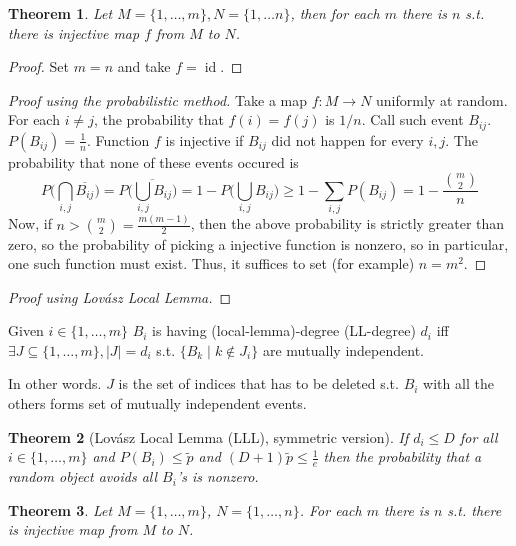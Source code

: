 \documentclass{article}
\theoremstyle{plain}
\newtheorem{thm}{Theorem}
\theoremstyle{definition}
\begin{document}
\begin{thm}
	Let $M=\{1,\ldots,m\},N=\{1,\ldots n\}$, then for each $m$ there is $n$ s.t. there is injective map $f$ from $M$ to $N$.
\end{thm}
\begin{proof}
	Set $m=n$ and take $f=\operatorname{id}$.
\end{proof}
\begin{proof}[Proof using the probabilistic method]
	Take a map $f:M\rightarrow {N}$ uniformly at random. For each $i\neq j$, the probability that $f(i)=f(j)$ is $1/n$. Call such event $B_{ij}$. $P(B_{ij})=\frac{1}{n}$. Function $f$ is injective if $B_{ij}$ did not happen for every $i,j$. The probability that none of these events occured is $$P\bigg(\bigcap_{i,j}\overline{B_{ij}}\bigg)=P\bigg(\overline{\bigcup_{i,j}B_{ij}}\bigg)=1-P\bigg(\bigcup_{i,j}B_{ij}\bigg)\geq 1-\sum_{i,j}P(B_{ij})=1-\frac{{m\choose 2}}{n}$$ Now, if $n > {m\choose 2}=\frac{m(m-1)}{2}$, then the above probability is strictly greater than zero, so the probability of picking a injective function is nonzero, so in particular, one such function must exist. Thus, it suffices to set (for example) $n = m^2$.
\end{proof}

\begin{proof}[Proof using Lovász Local Lemma]
	
\end{proof}








 Given $i\in\{1,\ldots, m\}$ $B_i$ is having (local-lemma)-degree (LL-degree) $d_i$ iff $\exists J\subseteq \{1,\ldots, m\}, |J|=d_i$ s.t. $\{B_k \mid k \notin J_i\}$ are mutually independent.

In other words. $J$ is the set of indices that has to be deleted s.t. $B_i$ with all the others forms set of mutually independent events.


\begin{thm}[Lovász Local Lemma (LLL), symmetric version]
	If $d_i \leq D$ for all $i\in\{1,\ldots,m\}$ and $P(B_i) \leq \tilde{p}$ and $(D+1)\tilde{p}\leq\frac{1}{e}$ then the probability that a random object avoids all $B_i$'s is nonzero.
\end{thm}


\begin{thm}
	Let $M=\{1,\ldots, m\}$, $N=\{1,\ldots, n\}$. For each $m$ there is $n$ s.t. there is injective map from $M$ to $N$.
\end{thm}
\end{document}

